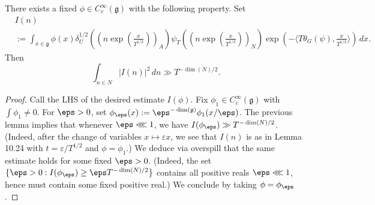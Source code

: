 \begin{corollary}\label{cor:sub-gln:there-exists-fixed}
  There exists a fixed $\phi \in C_c^\infty(\mathfrak{g})$ with the following property.  Set
  \begin{align*}
    &I(n) \\
    &:=
      \int_{x \in \mathfrak{g}}
      \phi(x) \delta_U^{1/2} \left( (n \exp(\tfrac{x}{T^{1/2}}))_A  \right)
      \psi_T ( (n \exp(\tfrac{x}{T^{1/2}}))_N )
      \exp (- \langle T \theta_G(\psi), \tfrac{x}{T^{1/2}} \rangle) \, d x.
  \end{align*}
  Then
  \begin{equation*}
    \int_{n \in N}
    \left\lvert
      I(n)
    \right\rvert^2
    \, d n
    \gg T^{-\dim(N)/2}.
  \end{equation*}
\end{corollary}
\begin{proof}
  Call the LHS of the desired estimate $I(\phi)$.  Fix $\phi_1 \in C_c^\infty(\mathfrak{g})$ with $\int \phi_1 \neq 0$.  For $\eps> 0$, set $\phi_\eps(x) := \eps^{-\dim(\mathfrak{g})} \phi_1(x/\eps)$.  The previous lemma implies that whenever $\eps \lll 1$, we have $I(\phi_\eps) \gg T^{-\dim(N)/2}$.  (Indeed, after the change of variables \(x\mapsto \varepsilon x\), we see that \(I(n)\) is as in Lemma 10.24 with \(t=\varepsilon/T^{1/2}\) and $\phi = \phi_1$.)  We deduce via overspill that the same estimate holds for some fixed $\eps > 0$.  (Indeed, the set $\{\eps > 0 : I(\phi_{\eps}) \geq \eps T^{-\dim(N)/2} \}$ contains all positive reals $\eps \lll 1$, hence must contain some fixed positive real.)  We conclude by taking $\phi = \phi_\eps$.
\end{proof}

